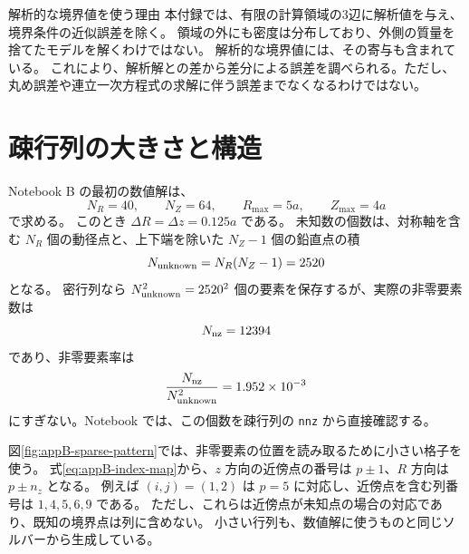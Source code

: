 \begin{cautionblock}{解析的な境界値を使う理由}
本付録では、有限の計算領域の3辺に解析値を与え、境界条件の近似誤差を除く。
領域の外にも密度は分布しており、外側の質量を捨てたモデルを解くわけではない。
解析的な境界値には、その寄与も含まれている。
これにより、解析解との差から差分による誤差を調べられる。ただし、丸め誤差や連立一次方程式の求解に伴う誤差までなくなるわけではない。
\end{cautionblock}

\section{疎行列の大きさと構造}
\label{sec:appB-sparse}

Notebook B の最初の数値解は、
\begin{equation}
 N_R=40,\qquad N_Z=64,\qquad R_{\max}=5a,\qquad Z_{\max}=4a
\label{eq:appB-main-grid}
\end{equation}
で求める。
このとき $\Delta R=\Delta z=0.125a$ である。
未知数の個数は、対称軸を含む $N_R$ 個の動径点と、上下端を除いた $N_Z-1$ 個の鉛直点の積
\begin{equation}
 N_{\rm unknown}=N_R(N_Z-1)=2520
\label{eq:appB-nunknown}
\end{equation}
となる。
密行列なら $N_{\rm unknown}^2=2520^2$ 個の要素を保存するが、実際の非零要素数は
\begin{equation}
 N_{\rm nz}=12394
\end{equation}
であり、非零要素率は
\begin{equation}
 \frac{N_{\rm nz}}{N_{\rm unknown}^2}=1.952\times 10^{-3}
\label{eq:appB-matrix-density}
\end{equation}
にすぎない。Notebook では、この個数を疎行列の \texttt{nnz} から直接確認する。

図\ref{fig:appB-sparse-pattern}では、非零要素の位置を読み取るために小さい格子を使う。
式\eqref{eq:appB-index-map}から、$z$ 方向の近傍点の番号は $p\pm1$、$R$ 方向は $p\pm n_z$ となる。
例えば $(i,j)=(1,2)$ は $p=5$ に対応し、近傍点を含む列番号は $1,4,5,6,9$ である。
ただし、これらは近傍点が未知点の場合の対応であり、既知の境界点は列に含めない。
小さい行列も、数値解に使うものと同じソルバーから生成している。

